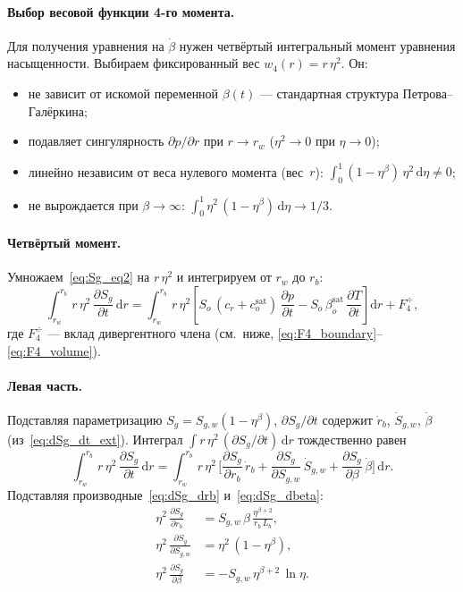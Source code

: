 \documentclass[12pt,a4paper]{article}
\newcommand{\dd}{\mathrm{d}}
\newcommand{\pp}{\partial}
\newcommand{\sat}{\mathrm{sat}}
\begin{document}
\paragraph{Выбор весовой функции 4-го момента.}
Для получения уравнения на $\dot\beta$ нужен
четвёртый интегральный момент уравнения насыщенности.
Выбираем фиксированный вес $w_4(r) = r\,\eta^2$. Он:
\begin{itemize}[nosep]
  \item не зависит от искомой переменной $\beta(t)$
    --- стандартная структура Петрова--Галёркина;
  \item подавляет сингулярность $\pp p/\pp r$ при $r \to r_w$
    ($\eta^2 \to 0$ при $\eta \to 0$);
  \item линейно независим от веса нулевого момента
    (вес~$r$): $\int_0^1 (1-\eta^\beta)\,\eta^2\,\dd\eta
    \ne 0$;
  \item не вырождается при $\beta \to \infty$:
    $\int_0^1 \eta^2\,(1-\eta^\beta)\,\dd\eta \to 1/3$.
\end{itemize}

\paragraph{Четвёртый момент.}
Умножаем~\eqref{eq:Sg_eq2} на $r\,\eta^2$
и интегрируем от $r_w$ до $r_b$:
\begin{equation}\label{eq:Sg_moment_beta}
  \int_{r_w}^{r_b} r\,\eta^2\,
    \frac{\pp S_g}{\pp t}\,\dd r
  = \int_{r_w}^{r_b} r\,\eta^2
    \left[
      S_o\,(c_r + c_o^\sat)\,\frac{\pp p}{\pp t}
      - S_o\,\beta_o^\sat\,\frac{\pp T}{\pp t}
    \right]\dd r
  + F_4^\div,
\end{equation}
где $F_4^\div$ --- вклад дивергентного члена
(см.\ ниже, \eqref{eq:F4_boundary}--\eqref{eq:F4_volume}).

\paragraph{Левая часть.}
Подставляя параметризацию
$S_g = S_{g,w}(1 - \eta^\beta)$,
$\pp S_g/\pp t$ содержит
$\dot{r}_b$, $\dot{S}_{g,w}$, $\dot\beta$
(из~\eqref{eq:dSg_dt_ext}).
Интеграл $\int r\,\eta^2\,(\pp S_g/\pp t)\,\dd r$
тождественно равен
\begin{equation}\label{eq:dM4_dt}
  \int_{r_w}^{r_b} r\,\eta^2\,
    \frac{\pp S_g}{\pp t}\,\dd r
  = \int_{r_w}^{r_b} r\,\eta^2\,
    \biggl[
      \frac{\pp S_g}{\pp r_b}\,\dot{r}_b
      + \frac{\pp S_g}{\pp S_{g,w}}\,\dot{S}_{g,w}
      + \frac{\pp S_g}{\pp\beta}\,\dot\beta
    \biggr]\,\dd r.
\end{equation}
Подставляя производные~\eqref{eq:dSg_drb}
и~\eqref{eq:dSg_dbeta}:
\begin{align}
  \eta^2\,\frac{\pp S_g}{\pp r_b}
  &= S_{g,w}\,\beta\,
     \frac{\eta^{\beta+2}}{r_b\,L_b},
  \label{eq:eta_dSg_drb} \\
  \eta^2\,\frac{\pp S_g}{\pp S_{g,w}}
  &= \eta^2\,(1-\eta^\beta),
  \label{eq:eta_dSg_dSgw} \\
  \eta^2\,\frac{\pp S_g}{\pp\beta}
  &= -S_{g,w}\,\eta^{\beta+2}\,\ln\eta.
  \label{eq:eta_dSg_dbeta}
\end{align}
\end{document}
